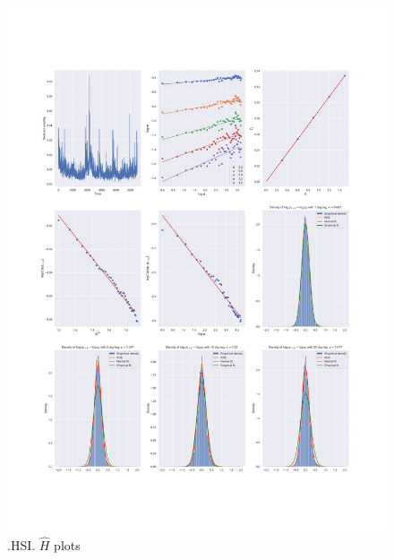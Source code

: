 	\begin{figure}[h]
		\centering
		\includegraphics[width=\linewidth]{fig/.HSI.pdf}
		\caption{.HSI. $\hat{H}$ plots}
	\end{figure}

